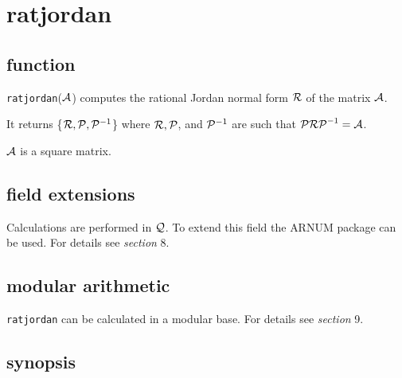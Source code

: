 \section{ratjordan}

\subsection{function}

{\tt ratjordan}(${\cal A}$) computes the rational Jordan normal form 
${\cal R}$ of the matrix ${\cal A}$.

It returns \{${\cal R}, {\cal P}, {\cal P}^{-1}$\} where ${\cal R}, 
{\cal P}$, and ${\cal P}^{-1}$ are such that ${\cal P R P}^{-1} = 
{\cal A}$.

${\cal A}$ is a square matrix.

\subsection{field extensions}

Calculations are performed in ${\cal Q}$. To extend this field the 
{\small ARNUM} package can be used. For details see {\it section} 8.

\subsection{modular arithmetic}

{\tt ratjordan} can be calculated in a modular base. For details see 
{\it section} 9.

\subsection{synopsis}

